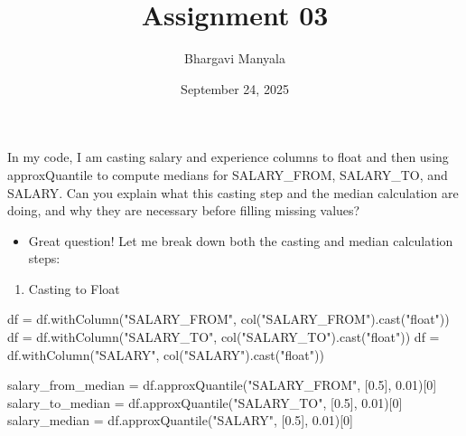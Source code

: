 \documentclass[
  letterpaper,
  DIV=11,
  numbers=noendperiod]{scrartcl}
\title{Assignment 03}
\author{Bhargavi Manyala}
\date{September 24, 2025}
\newenvironment{Shaded}{\begin{snugshade}}{\end{snugshade}}
\newcommand{\DecValTok}[1]{\textcolor[rgb]{0.68,0.00,0.00}{#1}}
\newcommand{\FloatTok}[1]{\textcolor[rgb]{0.68,0.00,0.00}{#1}}
\newcommand{\NormalTok}[1]{\textcolor[rgb]{0.00,0.23,0.31}{#1}}
\newcommand{\OperatorTok}[1]{\textcolor[rgb]{0.37,0.37,0.37}{#1}}
\newcommand{\StringTok}[1]{\textcolor[rgb]{0.13,0.47,0.30}{#1}}
\providecommand{\tightlist}{%
  \setlength{\itemsep}{0pt}\setlength{\parskip}{0pt}}\usepackage{longtable,booktabs,array}
\begin{document}
\maketitle


\begin{tcolorbox}[enhanced jigsaw, colback=white, left=2mm, colframe=quarto-callout-color-frame, leftrule=.75mm, bottomrule=.15mm, arc=.35mm, breakable, rightrule=.15mm, toprule=.15mm, opacityback=0]

In my code, I am casting salary and experience columns to float and then
using approxQuantile to compute medians for SALARY\_FROM, SALARY\_TO,
and SALARY. Can you explain what this casting step and the median
calculation are doing, and why they are necessary before filling missing
values?

\end{tcolorbox}

\begin{itemize}
\tightlist
\item
  Great question! Let me break down both the casting and median
  calculation steps:
\end{itemize}

\begin{enumerate}
\def\labelenumi{\arabic{enumi}.}
\tightlist
\item
  Casting to Float
\end{enumerate}

\begin{Shaded}
\begin{Highlighting}[]
\NormalTok{df }\OperatorTok{=}\NormalTok{ df.withColumn(}\StringTok{"SALARY\_FROM"}\NormalTok{, col(}\StringTok{"SALARY\_FROM"}\NormalTok{).cast(}\StringTok{"float"}\NormalTok{))}
\NormalTok{df }\OperatorTok{=}\NormalTok{ df.withColumn(}\StringTok{"SALARY\_TO"}\NormalTok{, col(}\StringTok{"SALARY\_TO"}\NormalTok{).cast(}\StringTok{"float"}\NormalTok{))}
\NormalTok{df }\OperatorTok{=}\NormalTok{ df.withColumn(}\StringTok{"SALARY"}\NormalTok{, col(}\StringTok{"SALARY"}\NormalTok{).cast(}\StringTok{"float"}\NormalTok{))}

\NormalTok{salary\_from\_median }\OperatorTok{=}\NormalTok{ df.approxQuantile(}\StringTok{"SALARY\_FROM"}\NormalTok{, [}\FloatTok{0.5}\NormalTok{], }\FloatTok{0.01}\NormalTok{)[}\DecValTok{0}\NormalTok{]}
\NormalTok{salary\_to\_median }\OperatorTok{=}\NormalTok{ df.approxQuantile(}\StringTok{"SALARY\_TO"}\NormalTok{, [}\FloatTok{0.5}\NormalTok{], }\FloatTok{0.01}\NormalTok{)[}\DecValTok{0}\NormalTok{]}
\NormalTok{salary\_median }\OperatorTok{=}\NormalTok{ df.approxQuantile(}\StringTok{"SALARY"}\NormalTok{, [}\FloatTok{0.5}\NormalTok{], }\FloatTok{0.01}\NormalTok{)[}\DecValTok{0}\NormalTok{]}
\end{Highlighting}
\end{Shaded}
\end{document}

